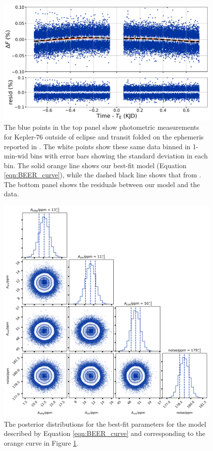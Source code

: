 \documentclass[manuscript]{aastex62}
\begin{document}
\begin{figure}
\includegraphics[width=\textwidth]{BEER-curve-fit_Analysis_of_Kepler76b.png}
\caption{The blue points in the top panel show photometric measurements for Kepler-76 outside of eclipse and transit folded on the ephemeris reported in \citet{2013ApJ...771...26F}. The white points show these same data binned in 1-min-wid bins with error bars showing the standard deviation in each bin. The solid orange line shows our best-fit model (Equation \ref{eqn:BEER_curve}), while the dashed black line shows that from \citet{2013ApJ...771...26F}. The bottom panel shows the residuals between our model and the data.}
\label{fig:BEER-curve-fit_Analysis_of_Kepler76b}
\end{figure}

\begin{figure}
\includegraphics[width=\textwidth]{BEER-curve-fit-params_Analysis-of-Kepler76b.png}
\caption{The posterior distributions for the best-fit parameters for the model described by Equation \ref{eqn:BEER_curve} and corresponding to the orange curve in Figure \ref{fig:BEER-curve-fit_Analysis_of_Kepler76b}. }
\label{fig:BEER-curve-fit-params_Analysis-of-Kepler76b}
\end{figure}
\end{document}
